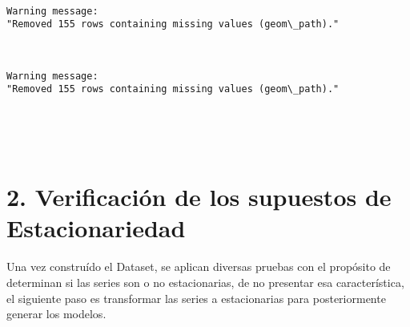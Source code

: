 \documentclass[11pt]{article}
\begin{document}
    \begin{center}
    \end{center}
    { \hspace*{\fill} \\}
    
    \begin{Verbatim}[commandchars=\\\{\}]
Warning message:
"Removed 155 rows containing missing values (geom\_path)."
    \end{Verbatim}

    \begin{center}
    \end{center}
    { \hspace*{\fill} \\}
    
    \begin{Verbatim}[commandchars=\\\{\}]
Warning message:
"Removed 155 rows containing missing values (geom\_path)."
    \end{Verbatim}

    \begin{center}
    \end{center}
    { \hspace*{\fill} \\}
    
    \begin{center}
    \end{center}
    { \hspace*{\fill} \\}
    
    \hypertarget{verificaciuxf3n-de-los-supuestos-de-estacionariedad}{%
\section{ 2. Verificación de los supuestos de
Estacionariedad}\label{verificaciuxf3n-de-los-supuestos-de-estacionariedad}}

    Una vez construído el Dataset, se aplican diversas pruebas con el
propósito de determinan si las series son o no estacionarias, de no
presentar esa característica, el siguiente paso es transformar las
series a estacionarias para posteriormente generar los modelos.
\end{document}
